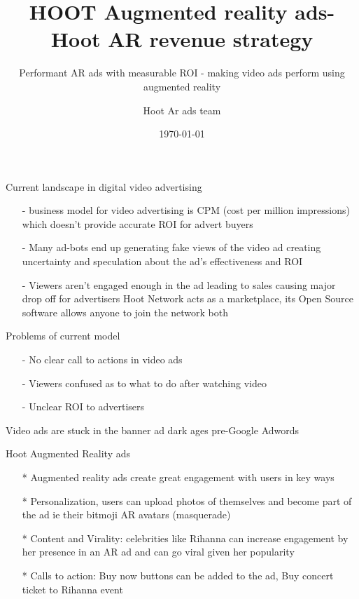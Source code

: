 \documentclass[10pt]{beamer}
\title{HOOT Augmented reality ads- Hoot AR revenue strategy}
\subtitle{Performant AR ads with measurable ROI  - making video ads perform using augmented reality}
\date{\today}
\author{Hoot Ar ads team}
\institute{Hoot Live inc., a Delaware C-corp}
\begin{document}
\maketitle



\begin{frame}[fragile]{Current landscape in digital video advertising }

\begin{itemize}
\item[-]business model for video advertising is CPM (cost per million impressions) which doesn’t provide accurate ROI for advert buyers
  
\item[-]Many ad-bots end up generating fake views of the video ad creating uncertainty and speculation about the ad’s effectiveness and ROI
\item[-]Viewers aren’t engaged enough in the ad leading to sales causing major drop off for advertisers
Hoot Network acts as a marketplace, its Open Source software allows anyone to join the network both 
\end{itemize}

\end{frame}
\begin{frame}[t]{Problems of current model}
\begin{itemize}
\item[-]No clear call to actions in video ads
\pause
\item[-]Viewers confused as to what to do after watching video
\pause
\item[-]Unclear ROI to advertisers
\end{itemize}
\pause
Video ads are stuck in the banner ad dark ages pre-Google Adwords 

\end{frame}
\begin{frame}[t]{Hoot Augmented Reality ads }
\begin{itemize}
\item[*]Augmented reality ads create great engagement with users in key ways
\pause
\item[*]Personalization, users can upload photos of themselves and become part of the ad ie their  bitmoji AR avatars (masquerade) 
\pause
\item[*]Content and Virality: celebrities like Rihanna can increase engagement by her presence in an AR ad and can go viral given her popularity
\pause
\item[*]Calls to action: Buy now buttons can be added to the ad, Buy concert ticket to Rihanna event
\end{itemize}
\end{frame}
\end{document}
